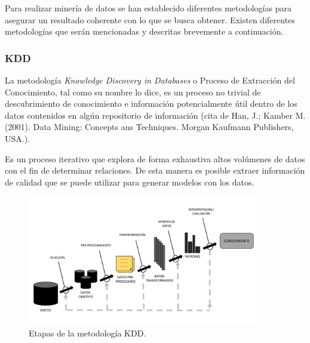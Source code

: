 
Para realizar minería de datos se han establecido diferentes metodologías para asegurar un resultado coherente con lo que se busca obtener. Existen diferentes metodologías que serán mencionadas y descritas brevemente a continuación.

\subsubsection{KDD}


La metodología \textit{Knowledge Discovery in Databases} o Proceso de Extracción del Conocimiento, tal como su nombre lo dice, es un proceso no trivial de descubrimiento de conocimiento e información potencialmente útil dentro de los datos contenidos en algún repositorio de información (cita de Han, J.; Kamber M. (2001). Data Mining: Concepts ans Techniques. Morgan Kaufmann Publishers, USA.). 

Es un proceso iterativo que explora de forma exhaustiva altos volúmenes de datos con el fin de determinar relaciones. De esta manera es posible extraer información de calidad que se puede utilizar para generar modelos con los datos. 

\begin{figure}[H]
  \centering
    \includegraphics[width=0.9\textwidth]{Figuras/KDD}
      \caption{Etapas de la metodología KDD.}
    \label{fig:kdd}
\end{figure}

